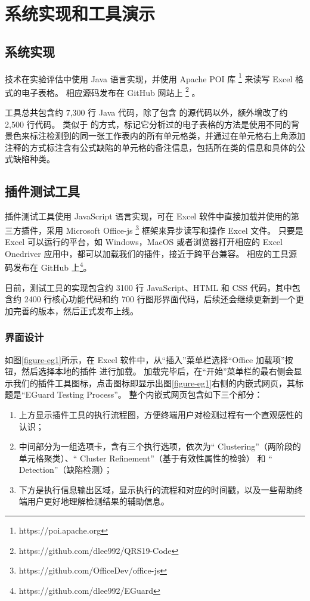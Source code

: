\chapter{系统实现和工具演示}


\section{\wa 系统实现}
\wa 技术在实验评估中使用 Java 语言实现，并使用 Apache POI 库 \footnote{https://poi.apache.org} 来读写 Excel 格式的电子表格。
相应源码发布在 GitHub 网站上 \footnote{https://github.com/dlee992/QRS19-Code} 。

\wa 工具总共包含约 7,300 行 Java 代码，除了包含 \cu 的源代码以外，额外增改了约 2,500 行代码。
类似于 \cu 的方式，\wa 标记它分析过的电子表格的方法是使用不同的背景色来标注检测到的同一张工作表内的所有单元格类，并通过在单元格右上角添加注释的方式标注含有公式缺陷的单元格的备注信息，包括所在类的信息和具体的公式缺陷种类。


\section{\eg 插件测试工具}
\eg 插件测试工具使用 JavaScript 语言实现，可在 Excel 软件中直接加载并使用的第三方插件，采用 Microsoft Office-js \footnote{https://github.com/OfficeDev/office-js} 框架来异步读写和操作 Excel 文件。
只要是 Excel 可以运行的平台，如 Windows，MacOS 或者浏览器打开相应的 Excel Onedriver 应用中，都可以加载我们的\eg 插件，接近于跨平台兼容。
相应的工具源码发布在 GitHub 上\footnote{https://github.com/dlee992/EGuard}。

目前，\eg 测试工具的实现包含约 3100 行 JavaScript、HTML 和 CSS 代码，其中包含约 2400 行核心功能代码和约 700 行图形界面代码，后续还会继续更新到一个更加完善的版本，然后正式发布上线。






\subsection{界面设计}
如图\ref{figure-eg1}所示，在 Excel 软件中，从“插入”菜单栏选择“Office 加载项”按钮，然后选择本地的插件 \eg 进行加载。
加载完毕后，在“开始”菜单栏的最右侧会显示我们的插件工具图标，点击图标即显示出图\ref{figure-eg1}右侧的内嵌式网页，其标题是“EGuard Testing Process”。
整个内嵌式网页包含如下三个部分：

\begin{enumerate}
    \item 上方显示\eg 插件工具的执行流程图，方便终端用户对检测过程有一个直观感性的认识；
    \item 中间部分为一组选项卡，含有三个执行选项，依次为“ Clustering”（两阶段的单元格聚类）、“ Cluster Refinement”（基于有效性属性的检验） 和 “ Detection”（缺陷检测）；
    \item 下方是执行信息输出区域，显示执行的流程和对应的时间戳，以及一些帮助终端用户更好地理解检测结果的辅助信息。
\end{enumerate}

